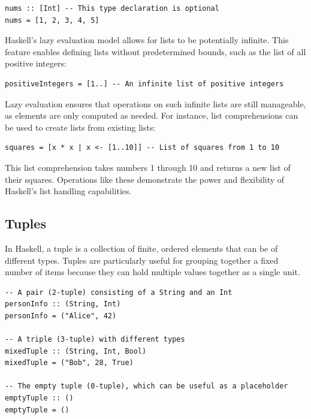 \documentclass[a4paper, 10pt]{article}
\begin{document}
        \lstset{language=Haskell}
        \begin{lstlisting}
nums :: [Int] -- This type declaration is optional
nums = [1, 2, 3, 4, 5]
        \end{lstlisting}

        Haskell's lazy evaluation model allows for lists to be potentially infinite. This feature enables defining lists without predetermined bounds, such as the list of all positive integers:

        \begin{lstlisting}
positiveIntegers = [1..] -- An infinite list of positive integers
        \end{lstlisting}

        Lazy evaluation ensures that operations on such infinite lists are still manageable, as elements are only computed as needed. For instance, list comprehensions can be used to create lists from existing lists:

        \begin{lstlisting}
squares = [x * x | x <- [1..10]] -- List of squares from 1 to 10
        \end{lstlisting}

        This list comprehension takes numbers 1 through 10 and returns a new list of their squares. Operations like these demonstrate the power and flexibility of Haskell's list handling capabilities.


        \subsection{Tuples}

            In Haskell, a tuple is a collection of finite, ordered elements that can be of different types. Tuples are particularly useful for grouping together a fixed number of items because they can hold multiple values together as a single unit.

            \lstset{language=Haskell}
            \begin{lstlisting}
-- A pair (2-tuple) consisting of a String and an Int
personInfo :: (String, Int)
personInfo = ("Alice", 42)

-- A triple (3-tuple) with different types
mixedTuple :: (String, Int, Bool)
mixedTuple = ("Bob", 28, True)

-- The empty tuple (0-tuple), which can be useful as a placeholder
emptyTuple :: ()
emptyTuple = ()
            \end{lstlisting}
\end{document}
